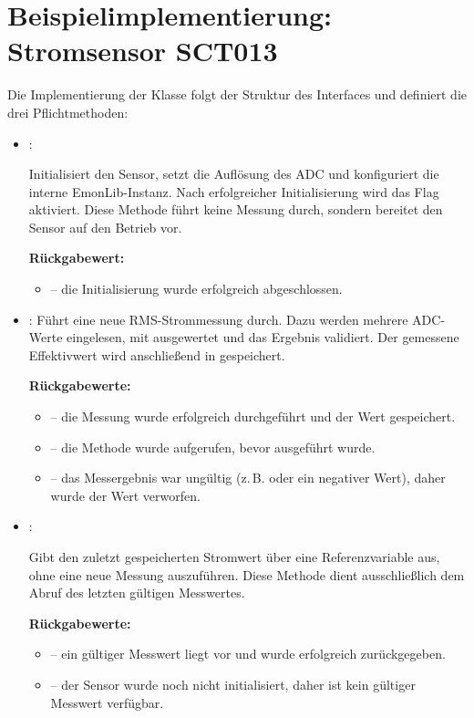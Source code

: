 \chapter{Beispielimplementierung: Stromsensor SCT013}

	Die Implementierung der Klasse  folgt der Struktur des Interfaces  
	und definiert die drei Pflichtmethoden:
	
	\begin{itemize}
		\item {}:
		
		Initialisiert den Sensor, setzt die Auflösung des ADC und konfiguriert die interne EmonLib-Instanz. 
		Nach erfolgreicher Initialisierung wird das Flag  aktiviert. 
		Diese Methode führt keine Messung durch, sondern bereitet den Sensor auf den Betrieb vor. 
		
		\textbf{Rückgabewert:} 
		
		\begin{itemize}
			\item {} – die Initialisierung wurde erfolgreich abgeschlossen. 
		\end{itemize}
		
		\item {}:
		Führt eine neue RMS-Strommessung durch. Dazu werden mehrere ADC-Werte eingelesen, mit  ausgewertet und das Ergebnis validiert. 
		Der gemessene Effektivwert wird anschlie{\ss}end in  gespeichert.
		
		\textbf{Rückgabewerte:}
		
		\begin{itemize}
			\item {} – die Messung wurde erfolgreich durchgeführt und der Wert gespeichert. 
			\item {} – die Methode wurde aufgerufen, bevor  ausgeführt wurde. 
			\item {} – das Messergebnis war ungültig (z.\,B.  oder ein negativer Wert), 
			daher wurde der Wert verworfen. 
		\end{itemize}
		
		\item {}:
		
		Gibt den zuletzt gespeicherten Stromwert über eine Referenzvariable aus, 
		ohne eine neue Messung auszuführen. 
		Diese Methode dient ausschlie{\ss}lich dem Abruf des letzten gültigen Messwertes. 
		
		\textbf{Rückgabewerte:}

		\begin{itemize}
			\item {} – ein gültiger Messwert liegt vor und wurde erfolgreich zurückgegeben. 
			\item {} – der Sensor wurde noch nicht initialisiert, 
			daher ist kein gültiger Messwert verfügbar. 
		\end{itemize}
	\end{itemize}

